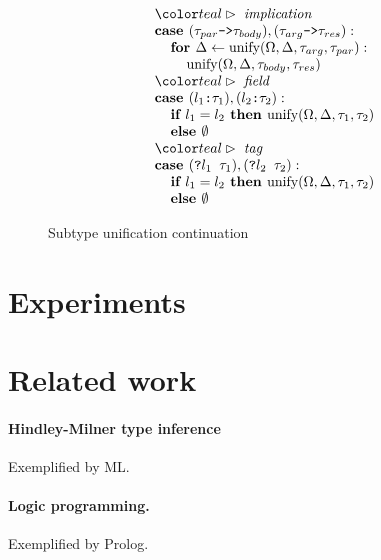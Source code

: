 \documentclass[acmsmall]{acmart}
\begin{document}
\begin{figure*}[h]
\[\begin{array}[t]{@{} l}
    \\

    \I \C{implication}
    \\
    \I \B{case } (\code{$\tau_{par}$->$\tau_{body}$}), (\code{$\tau_{arg}$->$\tau_{res}$}) : 
    \\
    \I\I \B{for } \Delta \leftarrow \F{unify}(\Omega, \Delta, \tau_{arg}, \tau_{par}):
    \\
    \I\I\I \F{unify}(\Omega, \Delta, \tau_{body}, \tau_{res})

    \\

    \I \C{field}
    \\
    \I \B{case } (\code{$l_1$:$\tau_1$}), (\code{$l_2$:$\tau_2$}) :
    \\
    \I\I \B{if } l_1 = l_2 \B{ then } \F{unify}(\Omega, \Delta, \tau_1, \tau_2)
    \\
    \I\I \B{else } \emptyset 

    \\

    \I \C{tag}
    \\
    \I \B{case } (\code{?$l_1$ $\tau_1$}), (\code{?$l_2$ $\tau_2$}) :
    \\
    \I\I \B{if } l_1 = l_2 \B{ then } \F{unify}(\Omega, \Delta, \tau_1, \tau_2)
    \\
    \I\I \B{else } \emptyset 
\end{array}
\]

\caption{Subtype unification continuation}
\label{fig:unifyContinue}
\end{figure*}


\section{Experiments}


\section{Related work}

\paragraph{Hindley-Milner type inference}
Exemplified by ML.

\paragraph{Logic programming.}
Exemplified by Prolog. 
\end{document}
